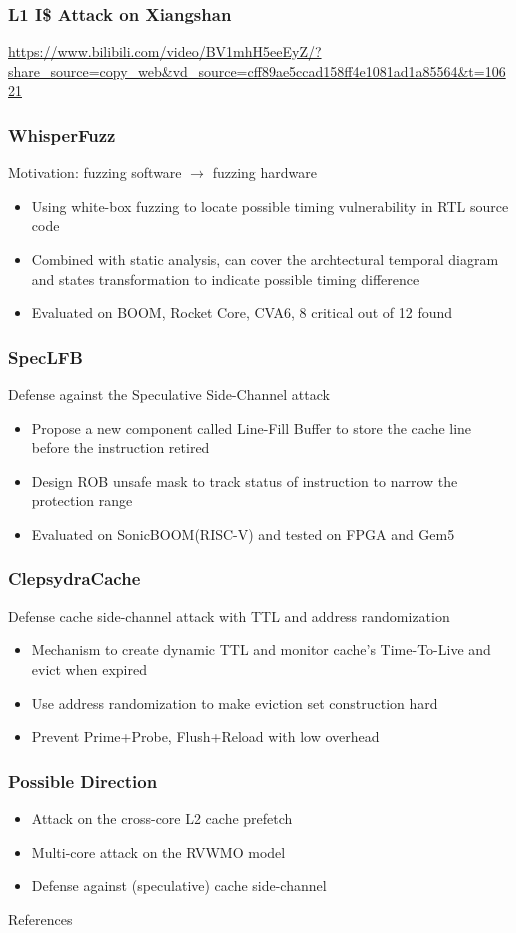 \documentclass{beamer}
\begin{document}
\begin{frame}
  \frametitle{L1 I\$ Attack on Xiangshan}
  \url{https://www.bilibili.com/video/BV1mhH5eeEyZ/?share_source=copy_web&vd_source=cff89ae5ccad158ff4e1081ad1a85564&t=10621}
\end{frame}

\begin{frame}
  \frametitle{WhisperFuzz\cite{whisperfuzz}}
  Motivation: fuzzing software $\rightarrow$ fuzzing hardware
  \begin{itemize}
    \item Using white-box fuzzing to locate possible timing vulnerability in RTL source code
    \item Combined with static analysis, can cover the archtectural temporal diagram and states transformation to indicate possible timing difference
    \item Evaluated on BOOM, Rocket Core, CVA6, 8 critical out of 12 found
  \end{itemize}
\end{frame}

\begin{frame}
  \frametitle{SpecLFB\cite{speclfb}}
  Defense against the Speculative Side-Channel attack
  \begin{itemize}
    \item Propose a new component called Line-Fill Buffer to store the cache line before the instruction retired
    \item Design ROB unsafe mask to track status of instruction to narrow the protection range
    \item Evaluated on SonicBOOM(RISC-V) and tested on FPGA and Gem5
  \end{itemize}
\end{frame}

\begin{frame}
  \frametitle{ClepsydraCache\cite{clepsydra}}
  Defense cache side-channel attack with TTL and address randomization
  \begin{itemize}
    \item Mechanism to create dynamic TTL and monitor cache's Time-To-Live and evict when expired
    \item Use address randomization to make eviction set construction hard
    \item Prevent Prime+Probe, Flush+Reload with low overhead
  \end{itemize}
\end{frame}

\begin{frame}
  \frametitle{Possible Direction}
  \begin{itemize}
    \item Attack on the cross-core L2 cache prefetch
    \item Multi-core attack on the RVWMO model
    \item Defense against (speculative) cache side-channel
  \end{itemize}
\end{frame}

\begin{frame}[allowframebreaks]{References}
\tiny
\printbibliography
\end{frame}
\end{document}

